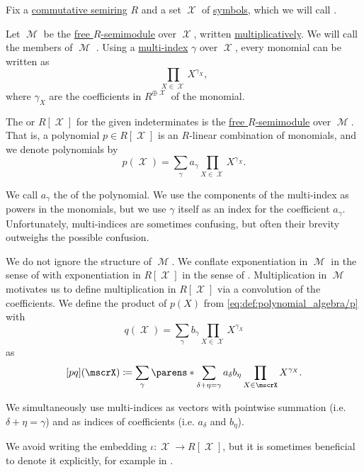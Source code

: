 \begin{definition}\label{def:polynomial_algebra}
  Fix a \hyperref[def:semiring/commutative]{commutative semiring} \( R \) and a set \( \mscrX \) of \hyperref[def:formal_language/symbol]{symbols}, which we will call .

  Let \( \mscrM \) be the \hyperref[def:free_semimodule]{free \( R \)-semimodule} over \( \mscrX \), written \hyperref[rem:additive_magma]{multiplicatively}. We will call the members of \( \mscrM \) . Using a \hyperref[def:multi_index]{multi-index} \( \gamma \) over \( \mscrX \), every monomial can be written as
  \begin{equation*}
    \prod_{X \in \mscrX} X^{\gamma_X},
  \end{equation*}
  where \( \gamma_X \) are the coefficients in \( R^{\oplus \mscrX} \) of the monomial.

  The  or  \( R[\mscrX] \) for the given indeterminates is the \hyperref[def:free_semimodule]{free \( R \)-semimodule} over \( \mscrM \). That is, a polynomial \( p \in R[\mscrX] \) is an \( R \)-linear combination of monomials, and we denote polynomials by
  \begin{equation}\label{eq:def:polynomial_algebra/p}
    p(\mscrX) = \sum_\gamma a_\gamma \prod_{X \in \mscrX} X^{\gamma_X}.
  \end{equation}

  We call \( a_\gamma \) the  of the polynomial. We use the components of the multi-index as powers in the monomials, but we use \( \gamma \) itself as an index for the coefficient \( a_\gamma \). Unfortunately, multi-indices are sometimes confusing, but often their brevity outweighs the possible confusion.

  We do not ignore the structure of \( \mscrM \). We conflate exponentiation in \( \mscrM \) in the sense of  with exponentiation in \( R[\mscrX] \) in the sense of . Multiplication in \( \mscrM \) motivates us to define multiplication in \( R[\mscrX] \) via a convolution of the coefficients. We define the product of \( p(X) \) from \eqref{eq:def:polynomial_algebra/p} with
  \begin{equation}\label{eq:def:polynomial_algebra/q}
    q(\mscrX) = \sum_\gamma b_\gamma \prod_{X \in \mscrX} X^{\gamma_X}
  \end{equation}
  as
  \begin{equation}\label{eq:def:polynomial_algebra/pq}
    [pq](\mscrX) \coloneqq \sum_\gamma \parens*{ \sum_{\delta + \eta = \gamma} a_\delta b_\eta } \prod_{X \in \mscrX} X^{\gamma_X}.
  \end{equation}

  We simultaneously use multi-indices as vectors with pointwise summation (i.e. \( \delta + \eta = \gamma \)) and as indices of coefficients (i.e. \( a_\delta \) and \( b_\eta \)).

  We avoid writing the embedding \( \iota: \mscrX \to R[\mscrX] \), but it is sometimes beneficial to denote it explicitly, for example in .
\end{definition}

